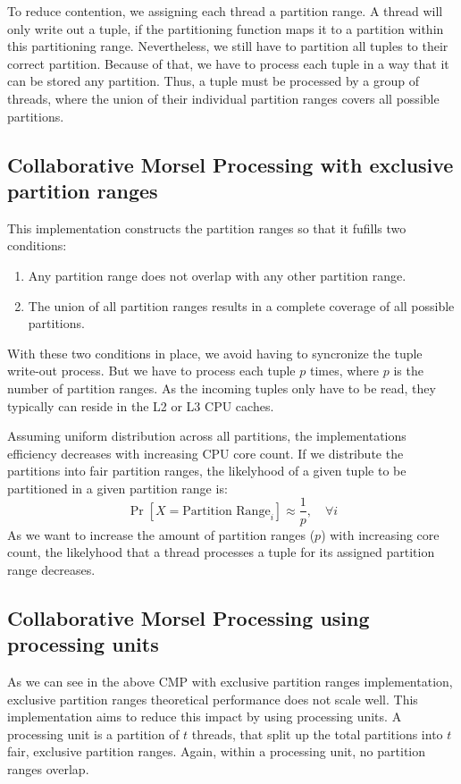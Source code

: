 To reduce contention, we assigning each thread a partition range.
A thread will only write out a tuple, if the partitioning function maps it to a partition within this partitioning range.
Nevertheless, we still have to partition all tuples to their correct partition.
Because of that, we have to process each tuple in a way that it can be stored any partition.
Thus, a tuple must be processed by a group of threads, where the union of their individual partition ranges covers all possible partitions.
\subsection{Collaborative Morsel Processing with exclusive partition ranges}
This implementation constructs the partition ranges so that it fufills two conditions:
\begin{enumerate}
  \item Any partition range does not overlap with any other partition range.
  \item The union of all partition ranges results in a complete coverage of all possible partitions.
\end{enumerate}
With these two conditions in place, we avoid having to syncronize the tuple write-out process.
But we have to process each tuple $p$ times, where $p$ is the number of partition ranges.
As the incoming tuples only have to be read, they typically can reside in the L2 or L3 \ac{CPU} caches.

Assuming uniform distribution across all partitions, the implementations efficiency decreases with increasing CPU core count.
If we distribute the partitions into fair partition ranges, the likelyhood of a given tuple to be partitioned in a given partition range is:
\begin{equation}\label{equation-CMP-exclusive-partition-ranges}
  \Pr[X=\textrm{Partition Range}_i] \approx \frac{1}{p},  \quad \forall i
\end{equation}
As we want to increase the amount of partition ranges ($p$) with increasing core count, the likelyhood that a thread processes a tuple for its assigned partition range decreases.
\subsection{Collaborative Morsel Processing using processing units}
As we can see in the above \ac{CMP} with exclusive partition ranges implementation, exclusive partition ranges theoretical performance does not scale well.
This implementation aims to reduce this impact by using processing units.
A processing unit is a partition of $t$ threads, that split up the total partitions into $t$ fair, exclusive partition ranges.
Again, within a processing unit, no partition ranges overlap.

